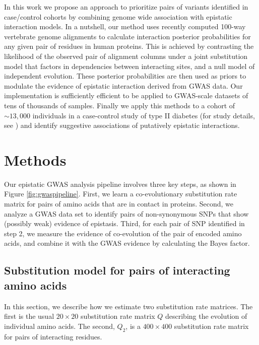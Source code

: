 In this work we propose an approach to prioritize pairs of variants identified in case/control cohorts by combining genome wide association with epistatic interaction models. In a nutshell, our method uses recently computed 100-way vertebrate genome alignments \cite{blanchette2004aligning} to calculate interaction posterior probabilities for any given pair of residues in human proteins. This is achieved by contrasting the likelihood of the observed pair of alignment columns under a joint substitution model that factors in dependencies between interacting sites, and a null model of independent evolution.  These posterior probabilities are then used as priors to modulate the evidence of epistatic interaction derived from GWAS data. Our implementation is sufficiently efficient to be applied to GWAS-scale datasets of tens of thousands of samples. Finally we apply this methods to a cohort of $\sim 13,000$ individuals in a case-control study of type II diabetes (for study details, see \cite{mccarthy2015T2D}) and identify suggestive associations of putatively epistatic interactions.

\section{Methods \label{sec:gwasMeth}}

Our epistatic GWAS analysis pipeline involves three key steps, as shown in Figure \ref{fig:gwaspipeline}. First, we learn a co-evolutionary substitution rate matrix for pairs of amino acids that are in contact in proteins. Second, we analyze a GWAS data set to identify pairs of non-synonymous SNPs that show (possibly weak) evidence of epistasis. Third, for each pair of SNP identified in step 2, we measure the evidence of co-evolution of the pair of encoded amino acids, and combine it with the GWAS evidence by calculating the Bayes factor.


\subsection{Substitution model for pairs of interacting amino acids \label{sec:gwasQ2}}

In this section, we describe how we estimate two substitution rate matrices. The first is the usual $20 \times 20$ substitution rate matrix $Q$ describing the evolution of individual amino acids. The second, $Q_2$, is a $400 \times 400$ substitution rate matrix for pairs of interacting residues. 

